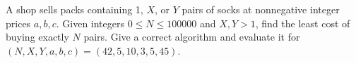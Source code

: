 A shop sells packs containing 1, $X$, or $Y$ pairs of socks at nonnegative integer prices $a,b,c$. Given integers $0\le N\le100000$ and $X,Y>1$, find the least cost of buying exactly $N$ pairs. Give a correct algorithm and evaluate it for $(N,X,Y,a,b,c)=(42,5,10,3,5,45)$.
